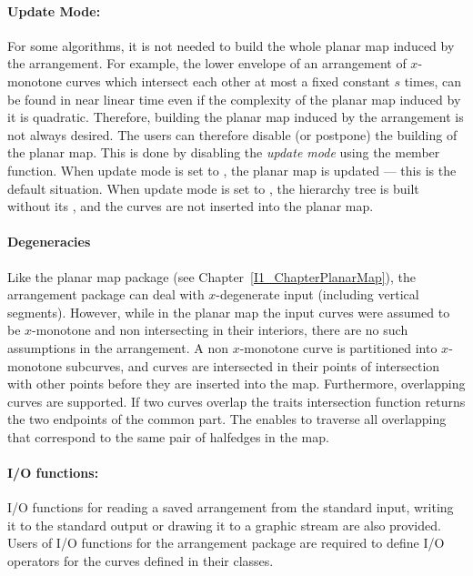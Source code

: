 \paragraph{Update Mode:} For some algorithms, it is not needed to build
the whole planar map induced by the arrangement. For example, the lower
envelope of an arrangement of $x$-monotone curves which intersect
each other at most a fixed constant $s$ times,
can be found in near linear time \cite{sa-dsstg-95, h-a-97}
even if
the complexity of the planar map induced by it is quadratic.
Therefore, building the planar map induced by the arrangement is not
always desired. The users can therefore disable (or postpone) the building
of the planar map. This is done by disabling the {\it update mode}
using the  member function. When update mode is
set to , the planar map is updated --- this is the
default situation. 
When update mode is set to , the hierarchy tree is built without
its , and the curves are not inserted into the planar map.

\paragraph{Degeneracies} Like the planar map package (see
Chapter~\ref{I1_ChapterPlanarMap}), the arrangement package can deal with
$x$-degenerate input (including vertical segments). However, while in the
planar map the input curves were assumed to be $x$-monotone and non
intersecting in their interiors, there are no such assumptions in the
arrangement. A non $x$-monotone curve is partitioned into $x$-monotone
subcurves, and curves are intersected in their points of intersection
with other points
before they are inserted into the map. Furthermore, overlapping curves are
supported. If two curves overlap the traits intersection function returns
the two endpoints of the common part. The 
enables to traverse all overlapping  that correspond to
the same pair of halfedges in the map.

\paragraph{I/O functions:}
I/O functions for reading a saved arrangement from the standard input, 
writing it to the standard output or drawing it to a graphic stream are also provided.
Users of I/O functions for the arrangement package are required to define I/O 
operators for the curves defined in their  classes.

